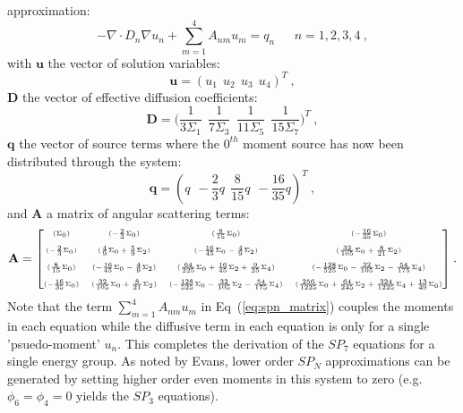 approximation:
\begin{equation}
  -\nabla \cdot D_n \nabla u_n + \sum_{m=1}^4 A_{nm} u_m =
  q_n\ \ \ \ \ \ \ n = 1,2,3,4\:,
  \label{eq:spn_matrix}
\end{equation}
with $\mathbf{u}$ the vector of solution variables:
\begin{equation}
  \mathbf{u} = ( u_1\ \ u_2\ \ u_3\ \ u_4 )^T \:,
  \label{eq:spn7_solution_vector}
\end{equation}
$\mathbf{D}$ the vector of effective diffusion coefficients:
\begin{equation}
  \mathbf{D} = \Bigg( \frac{1}{3\Sigma_1}\ \ \frac{1}{7\Sigma_3}\ \
  \frac{1}{11\Sigma_5}\ \ \frac{1}{15\Sigma_7} \Bigg)^T\:,
  \label{eq:spn7_diffusion_coeffs}
\end{equation}
$\mathbf{q}$ the vector of source terms where the $0^{th}$ moment
source has now been distributed through the system:
\begin{equation}
  \mathbf{q} = (
  q\ \ -\frac{2}{3}q\ \ \frac{8}{15}q\ \ -\frac{16}{35}q )^T\:,
  \label{eq:spn7_source_vector}
\end{equation}
and $\mathbf{A}$ a matrix of angular scattering terms:
\begin{equation}
  \mathbf{A} = 
  {\tiny \begin{bmatrix}
    (\Sigma_0) &
    (-\frac{2}{3}\Sigma_0) &
    (\frac{8}{15}\Sigma_0) &
    (-\frac{16}{35}\Sigma_0) \\
    &&&\\
    (-\frac{2}{3}\Sigma_0) &
    (\frac{4}{9}\Sigma_0 + \frac{5}{9}\Sigma_2) &
    (-\frac{16}{45}\Sigma_0 - \frac{4}{9}\Sigma_2) &
    (\frac{32}{105}\Sigma_0 + \frac{8}{21}\Sigma_2) \\
    &&&\\
    (\frac{8}{15}\Sigma_0) &
    (-\frac{16}{45}\Sigma_0 - \frac{4}{9}\Sigma_2) &
    (\frac{64}{225}\Sigma_0 + \frac{16}{45}\Sigma_2 + \frac{9}{25}\Sigma_4) &
    (-\frac{128}{525}\Sigma_0 - \frac{32}{105}\Sigma_2 - \frac{54}{175}\Sigma_4)
    \\ 
    &&&\\
    (-\frac{16}{35}\Sigma_0) &
    (\frac{32}{105}\Sigma_0 + \frac{8}{21}\Sigma_2) &
    (-\frac{128}{525}\Sigma_0 - \frac{32}{105}\Sigma_2 - \frac{54}{175}\Sigma_4)
    & 
    (\frac{256}{1225}\Sigma_0 + \frac{64}{245}\Sigma_2 +
    \frac{324}{1225}\Sigma_4 + \frac{13}{49}\Sigma_6)
  \end{bmatrix}}\:.
  \label{eq:A_matrix}
\end{equation}
Note that the term $\sum_{m=1}^4 A_{nm} u_m$ in
Eq~(\ref{eq:spn_matrix}) couples the moments in each equation while
the diffusive term in each equation is only for a single
'psuedo-moment' $u_n$. This completes the derivation of the $SP_7$
equations for a single energy group. As noted by Evans, lower order
$SP_N$ approximations can be generated by setting higher order even
moments in this system to zero (e.g. $\phi_6 = \phi_4 = 0$ yields the
$SP_3$ equations).

